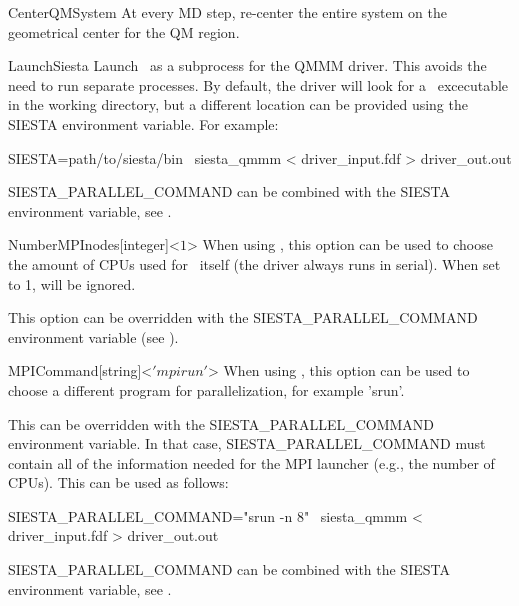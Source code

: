   \begin{fdflogicalF}{CenterQMSystem}
    At every MD step, re-center the entire system on the geometrical center for
    the QM region.
  \end{fdflogicalF}

  \begin{fdflogicalF}{LaunchSiesta}
    Launch \siesta\ as a subprocess for the QMMM driver. This avoids the need
    to run separate processes. By default, the driver will look for a \siesta\
    excecutable in the working directory, but a different location can be
    provided using the SIESTA environment variable. For example:

    \begin{shellexample}
      SIESTA=path/to/siesta/bin  \
        siesta_qmmm < driver_input.fdf > driver_out.out
    \end{shellexample}

    SIESTA\_PARALLEL\_COMMAND can be combined with the SIESTA environment variable,
    see .
  \end{fdflogicalF}

  \begin{fdfentry}{NumberMPInodes}[integer]<$1$>
    When using , this option can be used to choose the amount
    of CPUs used for \siesta\ itself (the driver always runs in serial). When
    set to 1, \fdf{MPICommand} will be ignored.

    This option can be overridden with the SIESTA\_PARALLEL\_COMMAND environment
    variable (see ).
  \end{fdfentry}

  \begin{fdfentry}{MPICommand}[string]<$'mpirun'$>
    When using , this option can be used to choose a different
    program for parallelization, for example 'srun'.

    This can be overridden with the SIESTA\_PARALLEL\_COMMAND environment
    variable. In that case, SIESTA\_PARALLEL\_COMMAND must contain all of the
    information needed for the MPI launcher (e.g., the number of CPUs). This
    can be used as follows:

    \begin{shellexample}
      SIESTA_PARALLEL_COMMAND="srun -n 8" \
        siesta_qmmm < driver_input.fdf > driver_out.out
    \end{shellexample}

    SIESTA\_PARALLEL\_COMMAND can be combined with the SIESTA environment variable,
    see .
  \end{fdfentry}